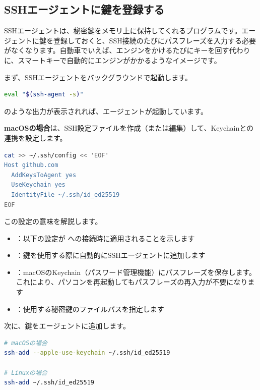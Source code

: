 \subsection{SSHエージェントに鍵を登録する}

SSHエージェントは、秘密鍵をメモリ上に保持してくれるプログラムです。エージェントに鍵を登録しておくと、SSH接続のたびにパスフレーズを入力する必要がなくなります。自動車でいえば、エンジンをかけるたびにキーを回す代わりに、スマートキーで自動的にエンジンがかかるようなイメージです。

まず、SSHエージェントをバックグラウンドで起動します。

\begin{lstlisting}[language=bash]
eval "$(ssh-agent -s)"
\end{lstlisting}

 のような出力が表示されれば、エージェントが起動しています。

\textbf{macOSの場合}は、SSH設定ファイルを作成（または編集）して、Keychainとの連携を設定します。

\begin{lstlisting}[language=bash]
cat >> ~/.ssh/config << 'EOF'
Host github.com
  AddKeysToAgent yes
  UseKeychain yes
  IdentityFile ~/.ssh/id_ed25519
EOF
\end{lstlisting}

この設定の意味を解説します。

\begin{itemize}
  \item {}：以下の設定が  への接続時に適用されることを示します
  \item {}：鍵を使用する際に自動的にSSHエージェントに追加します
  \item {}：macOSのKeychain（パスワード管理機能）にパスフレーズを保存します。これにより、パソコンを再起動してもパスフレーズの再入力が不要になります
  \item {}：使用する秘密鍵のファイルパスを指定します
\end{itemize}

次に、鍵をエージェントに追加します。

\begin{lstlisting}[language=bash]
# macOSの場合
ssh-add --apple-use-keychain ~/.ssh/id_ed25519

# Linuxの場合
ssh-add ~/.ssh/id_ed25519
\end{lstlisting}


